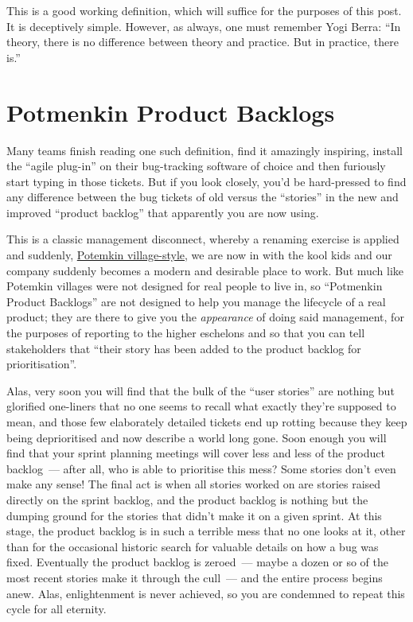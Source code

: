 \documentclass{book}
\begin{document}
This is a good working definition, which will suffice for the purposes
of this post. It is deceptively simple. However, as always, one must
remember Yogi Berra: ``In theory, there is no difference between theory
and practice. But in practice, there is.''

\section{Potmenkin Product Backlogs}

Many teams finish reading one such definition, find it amazingly
inspiring, install the ``agile plug-in'' on their bug-tracking software
of choice and then furiously start typing in those tickets. But if you
look closely, you'd be hard-pressed to find any difference between the
bug tickets of old versus the ``stories'' in the new and improved
``product backlog'' that apparently you are now using.

This is a classic management disconnect, whereby a renaming exercise
is applied and suddenly, \href{https://en.wikipedia.org/wiki/Potemkin_village}{Potemkin village-style}, we are now in with
the kool kids and our company suddenly becomes a modern and desirable
place to work. But much like Potemkin villages were not designed for
real people to live in, so ``Potmenkin Product Backlogs'' are not
designed to help you manage the lifecycle of a real product; they are
there to give you the \emph{appearance} of doing said management, for the
purposes of reporting to the higher eschelons and so that you can tell
stakeholders that ``their story has been added to the product backlog
for prioritisation''.

Alas, very soon you will find that the bulk of the ``user stories'' are
nothing but glorified one-liners that no one seems to recall what
exactly they're supposed to mean, and those few elaborately detailed
tickets end up rotting because they keep being deprioritised and now
describe a world long gone. Soon enough you will find that your sprint
planning meetings will cover less and less of the product backlog~---
after all, who is able to prioritise this mess?  Some stories don't
even make any sense! The final act is when all stories worked on are
stories raised directly on the sprint backlog, and the product backlog
is nothing but the dumping ground for the stories that didn't make it
on a given sprint. At this stage, the product backlog is in such a
terrible mess that no one looks at it, other than for the occasional
historic search for valuable details on how a bug was
fixed. Eventually the product backlog is zeroed~--- maybe a dozen or
so of the most recent stories make it through the cull~--- and the
entire process begins anew. Alas, enlightenment is never achieved, so
you are condemned to repeat this cycle for all eternity.
\end{document}
